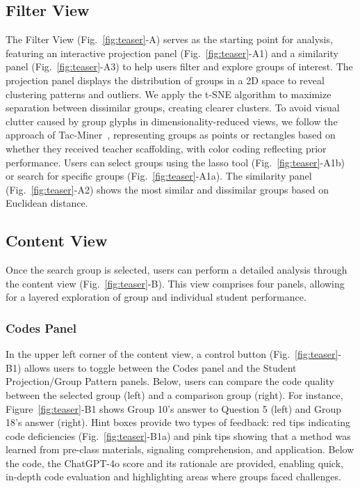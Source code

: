 \subsection{Filter View}
The Filter View (Fig.~\ref{fig:teaser}-A) serves as the starting point for analysis, featuring an interactive projection panel (Fig.~\ref{fig:teaser}-A1) and a similarity panel (Fig.~\ref{fig:teaser}-A3) to help users filter and explore groups of interest. 
The projection panel displays the distribution of groups in a 2D space to reveal clustering patterns and outliers. We apply the t-SNE algorithm to maximize separation between dissimilar groups, creating clearer clusters. 
To avoid visual clutter caused by group glyphs in dimensionality-reduced views, we follow the approach of Tac-Miner~\cite{wang2021tac}, representing groups as points or rectangles based on whether they received teacher scaffolding, with color coding reflecting prior performance. 
Users can select groups using the lasso tool (Fig.~\ref{fig:teaser}-A1b) or search for specific groups (Fig.~\ref{fig:teaser}-A1a). The similarity panel (Fig.~\ref{fig:teaser}-A2) shows the most similar and dissimilar groups based on Euclidean distance.  
 

 
\subsection{Content View}
Once the search group is selected, users can perform a detailed analysis through the content view (Fig.~\ref{fig:teaser}-B). This view comprises four panels, allowing for a layered exploration of group and individual student performance. 

\subsubsection{Codes Panel}
In the upper left corner of the content view, a control button (Fig.~\ref{fig:teaser}-B1) allows users to toggle between the Codes panel and the Student Projection/Group Pattern panels. Below, users can compare the code quality between the selected group (left) and a comparison group (right). 
For instance, Figure~\ref{fig:teaser}-B1 shows Group 10's answer to Question 5 (left) and Group 18's answer (right). Hint boxes provide two types of feedback: red tips indicating code deficiencies (Fig.~\ref{fig:teaser}-B1a) and pink tips showing that a method was learned from pre-class materials, signaling comprehension, and application. 
Below the code, the ChatGPT-4o score and its rationale are provided, enabling quick, in-depth code evaluation and highlighting areas where groups faced challenges. 


